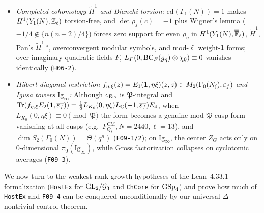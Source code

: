 \begin{theorem}
\begin{enumerate}[label=\textup{(\roman*)}]
\begin{itemize}
\item \emph{Completed cohomology $\widetilde{H}^1$ and Bianchi torsion:} $\mathrm{cd}(\Gamma_1(N)) = 1$ makes $H^1(Y_1(N), \mathbb{Z}_\ell)$ torsion-free, and $\det\rho_f(c) = -1$ plus Wigner's lemma ($-1/4 \notin \{n(n+2)/4\}$) forces zero support for even $\bar\rho_\eta$ in $H^1(Y_1(N), \overline{\mathbb{F}}_\ell)$, $\widetilde{H}^1$, Pan's $\widetilde{H}^1{}^{\mathrm{la}}$, overconvergent modular symbols, and mod-$\ell$ weight-$1$ forms; over imaginary quadratic fields $F$, $L_F(0, \mathrm{BC}_F(g_\eta)\otimes\chi_0) \equiv 0$ vanishes identically (\texttt{H06-2}).
\item \emph{Hilbert diagonal restriction $f_{\eta,\xi}(z) = E_1(\mathbf{1},\eta\xi)(z,z) \in M_2(\Gamma_0(N_{\mathfrak{f}}), \varepsilon_f)$ and Igusa towers $\mathrm{Ig}_\infty$:} Although $e_{\mathrm{Eis}}$ is $\mathfrak{P}$-integral and $\operatorname{Tr}(f_{\eta,\xi} E_2(\mathbf{1}, \overline{\varepsilon_f})) = \frac{1}{8} L_{K_0}(0, \eta\xi) L_{\mathbb{Q}}(-1, \overline{\varepsilon_f}) E_4$, when $L_{K_0}(0, \eta\xi) \equiv 0 \pmod{\mathfrak{P}}$ the form becomes a genuine mod-$\mathfrak{P}$ cusp form vanishing at all cusps (e.g.\ $F_{Q_8}^{\mathrm{CM}}, N=2440, \ell=13$), and $\dim S_2(\Gamma_0(N)) = \Theta(q^n)$ (\texttt{F09-1/2}); on $\mathrm{Ig}_\infty$, the center $Z_G$ acts only on $0$-dimensional $\pi_0(\mathrm{Ig}_\infty)$, while Gross factorization collapses on cyclotomic averages (\texttt{F09-3}).
\end{itemize}
\end{enumerate}
\end{theorem}

We now turn to the weakest rank-growth hypotheses of the Lean~4.33.1 formalization (\texttt{HostEx} for $\mathrm{GL}_2/\mathcal{G}_3$ and \texttt{ChCore} for $\mathrm{GSp}_4$) and prove how much of \texttt{HostEx} and \texttt{F09-4} can be conquered unconditionally by our universal $\Delta$-nontrivial control theorem.

